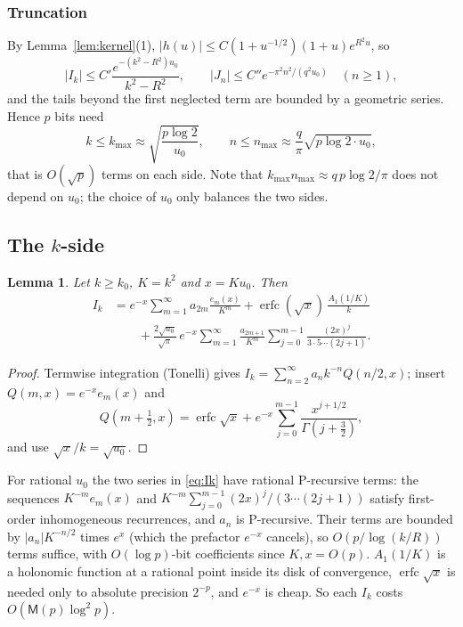 \documentclass[11pt]{amsart}
\newtheorem{lemma}[theorem]{Lemma}
\theoremstyle{definition}
\theoremstyle{remark}
\newcommand{\erfc}{\operatorname{erfc}}
\newcommand{\Mul}{\mathsf{M}}
\begin{document}
\subsubsection{Truncation} By Lemma~\ref{lem:kernel}(1), $|h(u)| \le C(1+u^{-1/2})(1+u)e^{R^2u}$, so
\[
  |I_k| \le C' \frac{e^{-(k^2 - R^2)u_0}}{k^2 - R^2}, \qquad
  |J_n| \le C'' e^{-\pi^2n^2/(q^2u_0)} \quad (n \ge 1),
\]
and the tails beyond the first neglected term are bounded by a geometric series. Hence $p$ bits need
\begin{equation}\label{eq:counts}
  k \le k_{\max} \approx \sqrt{\frac{p\log 2}{u_0}}, \qquad n \le n_{\max} \approx \frac{q}{\pi}\sqrt{p\log 2\cdot u_0},
\end{equation}
that is $O(\sqrt p)$ terms on each side. Note that $k_{\max}n_{\max} \approx q\,p\log 2/\pi$ does not
depend on $u_0$; the choice of $u_0$ only balances the two sides.

\subsection{The $k$-side}

\begin{lemma}\label{lem:kside}
Let $k \ge k_0$, $K = k^2$ and $x = Ku_0$. Then
\begin{equation}\label{eq:Ik}
\begin{split}
  I_k &= e^{-x} \sum_{m=1}^{\infty} a_{2m} \frac{e_m(x)}{K^m} + \erfc(\sqrt x)\, \frac{A_1(1/K)}{k} \\
      &\qquad + \frac{2\sqrt{u_0}}{\sqrt\pi}\, e^{-x} \sum_{m=1}^{\infty} \frac{a_{2m+1}}{K^m}
        \sum_{j=0}^{m-1} \frac{(2x)^j}{3\cdot5\cdots(2j+1)} .
\end{split}
\end{equation}
\end{lemma}

\begin{proof}
Termwise integration (Tonelli) gives $I_k = \sum_{n=2}^{\infty} a_n k^{-n}Q(n/2, x)$; insert $Q(m, x) = e^{-x}e_m(x)$ and
\[
  Q(m+\tfrac12, x) = \erfc\sqrt x + e^{-x}\sum_{j=0}^{m-1} \frac{x^{j+1/2}}{\Gamma(j+\frac32)},
\]
and use $\sqrt{x}/k = \sqrt{u_0}$.
\end{proof}

For rational $u_0$ the two series in \eqref{eq:Ik} have rational P-recursive terms: the sequences
$K^{-m}e_m(x)$ and $K^{-m}\sum_{j=0}^{m-1}(2x)^j/(3\cdots(2j+1))$ satisfy first-order inhomogeneous recurrences,
and $a_n$ is P-recursive. Their terms are bounded by $|a_n| K^{-n/2}$ times $e^{x}$ (which the prefactor
$e^{-x}$ cancels), so $O(p/\log(k/R))$ terms suffice, with $O(\log p)$-bit coefficients since $K, x = O(p)$.
$A_1(1/K)$ is a holonomic function at a rational point inside its disk of convergence, $\erfc\sqrt x$ is
needed only to absolute precision $2^{-p}$, and $e^{-x}$ is cheap. So each $I_k$ costs $O(\Mul(p)\log^2p)$.
\end{document}

